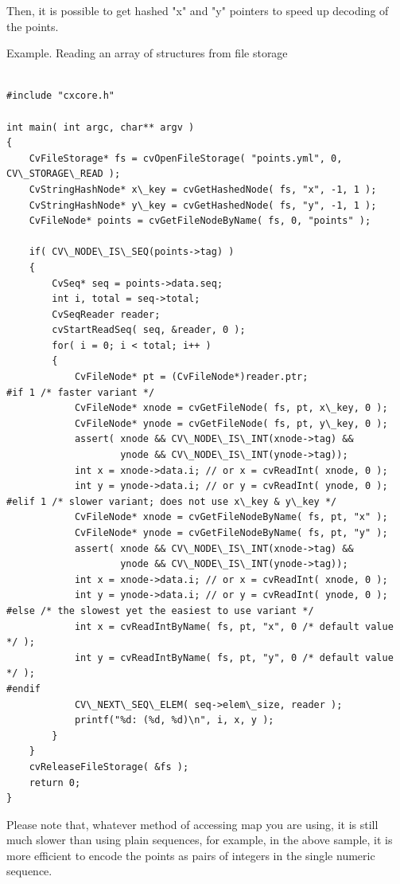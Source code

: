Then, it is possible to get hashed "x" and "y" pointers to speed up decoding of the points.

Example. Reading an array of structures from file storage

\begin{lstlisting}

#include "cxcore.h"

int main( int argc, char** argv )
{
    CvFileStorage* fs = cvOpenFileStorage( "points.yml", 0, CV\_STORAGE\_READ );
    CvStringHashNode* x\_key = cvGetHashedNode( fs, "x", -1, 1 );
    CvStringHashNode* y\_key = cvGetHashedNode( fs, "y", -1, 1 );
    CvFileNode* points = cvGetFileNodeByName( fs, 0, "points" );

    if( CV\_NODE\_IS\_SEQ(points->tag) )
    {
        CvSeq* seq = points->data.seq;
        int i, total = seq->total;
        CvSeqReader reader;
        cvStartReadSeq( seq, &reader, 0 );
        for( i = 0; i < total; i++ )
        {
            CvFileNode* pt = (CvFileNode*)reader.ptr;
#if 1 /* faster variant */
            CvFileNode* xnode = cvGetFileNode( fs, pt, x\_key, 0 );
            CvFileNode* ynode = cvGetFileNode( fs, pt, y\_key, 0 );
            assert( xnode && CV\_NODE\_IS\_INT(xnode->tag) &&
                    ynode && CV\_NODE\_IS\_INT(ynode->tag));
            int x = xnode->data.i; // or x = cvReadInt( xnode, 0 );
            int y = ynode->data.i; // or y = cvReadInt( ynode, 0 );
#elif 1 /* slower variant; does not use x\_key & y\_key */
            CvFileNode* xnode = cvGetFileNodeByName( fs, pt, "x" );
            CvFileNode* ynode = cvGetFileNodeByName( fs, pt, "y" );
            assert( xnode && CV\_NODE\_IS\_INT(xnode->tag) &&
                    ynode && CV\_NODE\_IS\_INT(ynode->tag));
            int x = xnode->data.i; // or x = cvReadInt( xnode, 0 );
            int y = ynode->data.i; // or y = cvReadInt( ynode, 0 );
#else /* the slowest yet the easiest to use variant */
            int x = cvReadIntByName( fs, pt, "x", 0 /* default value */ );
            int y = cvReadIntByName( fs, pt, "y", 0 /* default value */ );
#endif
            CV\_NEXT\_SEQ\_ELEM( seq->elem\_size, reader );
            printf("%d: (%d, %d)\n", i, x, y );
        }
    }
    cvReleaseFileStorage( &fs );
    return 0;
}

\end{lstlisting}

Please note that, whatever method of accessing map you are using, it is
still much slower than using plain sequences, for example, in the above
sample, it is more efficient to encode the points as pairs of integers
in the single numeric sequence.

